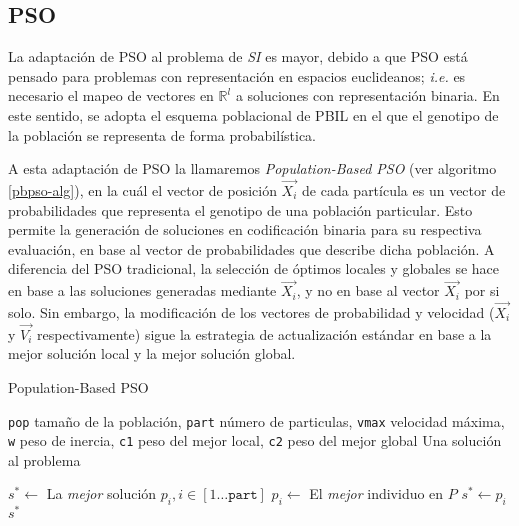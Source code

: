 \subsection{PSO}

La adaptación de PSO al problema de \emph{SI} es mayor, debido a que PSO está pensado para problemas con representación en espacios euclideanos; \emph{i.e.} es necesario el mapeo de vectores en $\mathbb{R}^l$ a soluciones con representación binaria. En este sentido, se adopta el esquema poblacional de PBIL en el que el genotipo de la población se representa de forma probabilística.

A esta adaptación de PSO la llamaremos \emph{Population-Based PSO} (ver algoritmo \ref{pbpso-alg}), en la cuál el vector de posición $\vec{X_i}$ de cada partícula es un vector de probabilidades que representa el genotipo de una población particular. Esto permite la generación de soluciones en codificación binaria para su respectiva evaluación, en base al vector de probabilidades que describe dicha población. A diferencia del PSO tradicional, la selección de óptimos locales y globales se hace en base a las soluciones generadas mediante $\vec{X_i}$, y no en base al vector $\vec{X_i}$ por si solo. Sin embargo, la modificación de los vectores de probabilidad y velocidad ($\vec{X_i}$ y $\vec{V_i}$ respectivamente) sigue la estrategia de actualización estándar en base a la mejor solución local y la mejor solución global.

\begin{algorithm}
\caption{Population-Based PSO}
\label{pbpso-alg}
\begin{algorithmic}[1]

\Require \texttt{pop} tamaño de la población,
	\texttt{part} número de particulas,
	\texttt{vmax} velocidad máxima,
	\texttt{w} peso de inercia,
	\texttt{c1} peso del mejor local,
	\texttt{c2} peso del mejor global
\Ensure Una solución al problema

\EndFor
\State $s^* \gets$ La \emph{mejor} solución $p_i, i \in [1 \dots \texttt{part}]$
			\State $p_i \gets$ El \emph{mejor} individuo en $P$
				\State $s^* \gets p_i$
			\EndIf
		\EndIf
	\EndFor
\EndWhile
\State \Return $s^*$

\end{algorithmic}
\end{algorithm}

